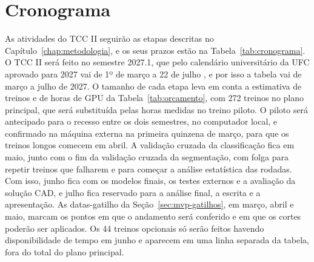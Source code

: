 \chapter{Cronograma}
\label{chap:cronograma}

As atividades do TCC II seguirão as etapas descritas no Capítulo~\ref{chap:metodologia}, e os seus prazos estão na Tabela~\ref{tab:cronograma}. O TCC II será feito no semestre 2027.1, que pelo calendário universitário da UFC aprovado para 2027 vai de 1º de março a 22 de julho \cite{ufc2026calendario}, e por isso a tabela vai de março a julho de 2027. O tamanho de cada etapa leva em conta a estimativa de treinos e de horas de GPU da Tabela~\ref{tab:orcamento}, com 272 treinos no plano principal, que será substituída pelas horas medidas no treino piloto. O piloto será antecipado para o recesso entre os dois semestres, no computador local, e confirmado na máquina externa na primeira quinzena de março, para que os treinos longos comecem em abril. A validação cruzada da classificação fica em maio, junto com o fim da validação cruzada da segmentação, com folga para repetir treinos que falharem e para começar a análise estatística das rodadas. Com isso, junho fica com os modelos finais, os testes externos e a avaliação da solução CAD, e julho fica reservado para a análise final, a escrita e a apresentação. As datas-gatilho da Seção~\ref{sec:mvp-gatilhos}, em março, abril e maio, marcam os pontos em que o andamento será conferido e em que os cortes poderão ser aplicados. Os 44 treinos opcionais só serão feitos havendo disponibilidade de tempo em junho e aparecem em uma linha separada da tabela, fora do total do plano principal.

